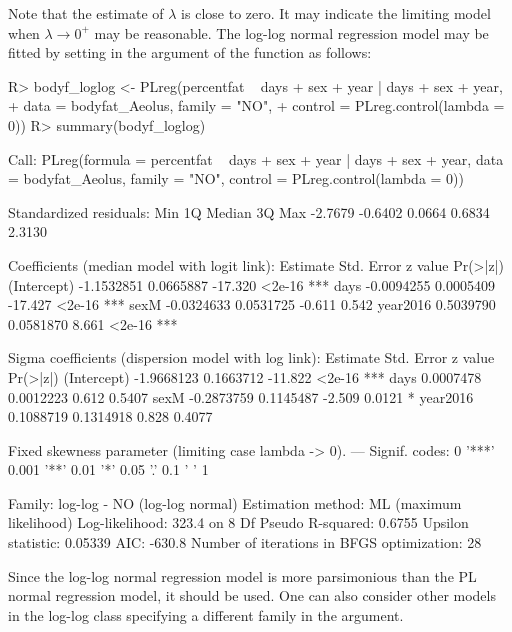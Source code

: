 Note that the estimate of $\lambda$ is close to zero. It may indicate the limiting model when $\lambda \to 0^+$ may be reasonable. The log-log normal regression model may be fitted by setting  in the  argument of the  function as follows:
%
\begin{Schunk}
\begin{Sinput}
R> bodyf_loglog <- PLreg(percentfat ~ days + sex + year | days + sex + year,
+                        data = bodyfat_Aeolus, family = "NO",
+                        control = PLreg.control(lambda = 0))
R> summary(bodyf_loglog)
\end{Sinput}
\begin{Soutput}
Call:
PLreg(formula = percentfat ~ days + sex + year | days + sex + 
    year, data = bodyfat_Aeolus, family = "NO", 
    control = PLreg.control(lambda = 0))

Standardized residuals:
    Min      1Q  Median      3Q     Max 
-2.7679 -0.6402  0.0664  0.6834  2.3130 

Coefficients (median model with logit link):
              Estimate Std. Error z value Pr(>|z|)    
(Intercept) -1.1532851  0.0665887 -17.320   <2e-16 ***
days        -0.0094255  0.0005409 -17.427   <2e-16 ***
sexM        -0.0324633  0.0531725  -0.611    0.542    
year2016     0.5039790  0.0581870   8.661   <2e-16 ***

Sigma coefficients (dispersion model with log link):
              Estimate Std. Error z value Pr(>|z|)    
(Intercept) -1.9668123  0.1663712 -11.822   <2e-16 ***
days         0.0007478  0.0012223   0.612   0.5407    
sexM        -0.2873759  0.1145487  -2.509   0.0121 *  
year2016     0.1088719  0.1314918   0.828   0.4077    

Fixed skewness parameter (limiting case lambda -> 0).
---
Signif. codes:  0 '***' 0.001 '**' 0.01 '*' 0.05 '.' 0.1 ' ' 1 

Family: log-log - NO (log-log normal)
Estimation method: ML (maximum likelihood)
Log-likelihood: 323.4 on 8 Df
Pseudo R-squared: 0.6755
Upsilon statistic: 0.05339
AIC: -630.8
Number of iterations in BFGS optimization: 28 
\end{Soutput}
\end{Schunk}
%

Since the log-log normal regression model is more parsimonious than the PL normal regression model, it should be used. One can also consider other models in the log-log class specifying a different family in the  argument.

